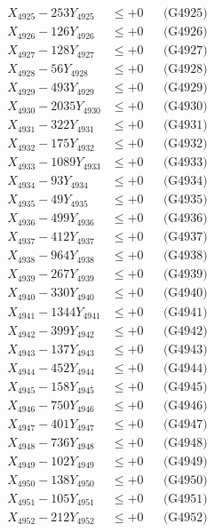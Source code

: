 \documentclass[a4paper,10pt]{article}
\begin{document}
{\begin{align}
X_{4925} - 253Y_{4925} &\leq +0 && \text{(G4925)} \\
X_{4926} - 126Y_{4926} &\leq +0 && \text{(G4926)} \\
X_{4927} - 128Y_{4927} &\leq +0 && \text{(G4927)} \\
X_{4928} - 56Y_{4928} &\leq +0 && \text{(G4928)} \\
X_{4929} - 493Y_{4929} &\leq +0 && \text{(G4929)} \\
X_{4930} - 2035Y_{4930} &\leq +0 && \text{(G4930)} \\
\allowbreak
X_{4931} - 322Y_{4931} &\leq +0 && \text{(G4931)} \\
X_{4932} - 175Y_{4932} &\leq +0 && \text{(G4932)} \\
X_{4933} - 1089Y_{4933} &\leq +0 && \text{(G4933)} \\
X_{4934} - 93Y_{4934} &\leq +0 && \text{(G4934)} \\
X_{4935} - 49Y_{4935} &\leq +0 && \text{(G4935)} \\
X_{4936} - 499Y_{4936} &\leq +0 && \text{(G4936)} \\
X_{4937} - 412Y_{4937} &\leq +0 && \text{(G4937)} \\
X_{4938} - 964Y_{4938} &\leq +0 && \text{(G4938)} \\
X_{4939} - 267Y_{4939} &\leq +0 && \text{(G4939)} \\
X_{4940} - 330Y_{4940} &\leq +0 && \text{(G4940)} \\
\allowbreak
X_{4941} - 1344Y_{4941} &\leq +0 && \text{(G4941)} \\
X_{4942} - 399Y_{4942} &\leq +0 && \text{(G4942)} \\
X_{4943} - 137Y_{4943} &\leq +0 && \text{(G4943)} \\
X_{4944} - 452Y_{4944} &\leq +0 && \text{(G4944)} \\
X_{4945} - 158Y_{4945} &\leq +0 && \text{(G4945)} \\
X_{4946} - 750Y_{4946} &\leq +0 && \text{(G4946)} \\
X_{4947} - 401Y_{4947} &\leq +0 && \text{(G4947)} \\
X_{4948} - 736Y_{4948} &\leq +0 && \text{(G4948)} \\
X_{4949} - 102Y_{4949} &\leq +0 && \text{(G4949)} \\
X_{4950} - 138Y_{4950} &\leq +0 && \text{(G4950)} \\
\allowbreak
X_{4951} - 105Y_{4951} &\leq +0 && \text{(G4951)} \\
X_{4952} - 212Y_{4952} &\leq +0 && \text{(G4952)} \\

\end{align}}
\end{document}
